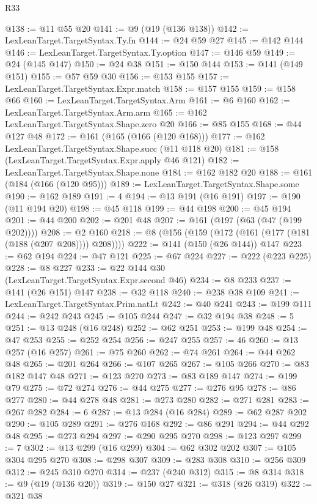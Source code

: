 \begin{lexlean}{R33}
\begin{coremodule}
@138 := @11 @55 @20
@141 := @9 (@19 (@136 @138))
@142 := LexLeanTarget.TargetSyntax.Ty.fn
@144 := @24 @59 @27
@145 := @142 @144
@146 := LexLeanTarget.TargetSyntax.Ty.option
@147 := @146 @59
@149 := @24 (@145 @147)
@150 := @24 @38
@151 := @150 @144
@153 := @141 (@149 @151)
@155 := @57 @59 @30
@156 := @153 @155
@157 := LexLeanTarget.TargetSyntax.Expr.match
@158 := @157 @155
@159 := @158 @66
@160 := LexLeanTarget.TargetSyntax.Arm
@161 := @6 @160
@162 := LexLeanTarget.TargetSyntax.Arm.arm
@165 := @162 LexLeanTarget.TargetSyntax.Shape.zero @20
@166 := @85 @155
@168 := @44 @127 @48
@172 := @161 (@165 (@166 (@120 @168)))
@177 := @162 LexLeanTarget.TargetSyntax.Shape.succ (@11 @118 @20)
@181 := @158 (LexLeanTarget.TargetSyntax.Expr.apply @46 @121)
@182 := LexLeanTarget.TargetSyntax.Shape.none
@184 := @162 @182 @20
@188 := @161 (@184 (@166 (@120 @95)))
@189 := LexLeanTarget.TargetSyntax.Shape.some
@190 := @162 @189
@191 := 4
@194 := @13 @191 (@16 @191)
@197 := @190 (@11 @194 @20)
@198 := @45 @118
@199 := @44 @198
@200 := @45 @194
@201 := @44 @200
@202 := @201 @48
@207 := @161 (@197 (@63 (@47 (@199 @202))))
@208 := @2 @160
@218 := @8 (@156 (@159 (@172 (@161 (@177 (@181 (@188 (@207 @208)))) @208))))
@222 := @141 (@150 (@26 @144)) @147
@223 := @62 @194
@224 := @47 @121
@225 := @67 @224
@227 := @222 (@223 @225)
@228 := @8 @227
@233 := @22 @144 @30 (LexLeanTarget.TargetSyntax.Expr.second @46)
@234 := @8 @233
@237 := @141 (@26 @151) @147
@238 := @32 @118
@240 := @238 @38 @109
@241 := LexLeanTarget.TargetSyntax.Prim.natLt
@242 := @40 @241
@243 := @199 @111
@244 := @242 @243
@245 := @105 @244
@247 := @32 @194 @38
@248 := 5
@251 := @13 @248 (@16 @248)
@252 := @62 @251
@253 := @199 @48
@254 := @47 @253
@255 := @252 @254
@256 := @247 @255
@257 := 46
@260 := @13 @257 (@16 @257)
@261 := @75 @260
@262 := @74 @261
@264 := @44 @262 @48
@265 := @201 @264
@266 := @107 @265
@267 := @105 @266
@270 := @83 @182 @147 @48
@271 := @123 @270
@273 := @83 @189 @147
@274 := @199 @79
@275 := @72 @274
@276 := @44 @275
@277 := @276 @95
@278 := @86 @277
@280 := @44 @278 @48
@281 := @273 @280
@282 := @271 @281
@283 := @267 @282
@284 := 6
@287 := @13 @284 (@16 @284)
@289 := @62 @287 @202
@290 := @105 @289
@291 := @276 @168
@292 := @86 @291
@294 := @44 @292 @48
@295 := @273 @294
@297 := @290 @295 @270
@298 := @123 @297
@299 := 7
@302 := @13 @299 (@16 @299)
@304 := @62 @302 @202
@307 := @105 @304 @295 @270
@308 := @298 @307
@309 := @283 @308
@310 := @256 @309
@312 := @245 @310 @270
@314 := @237 (@240 @312)
@315 := @8 @314
@318 := @9 (@19 (@136 @20))
@319 := @150 @27
@321 := @318 (@26 @319)
@322 := @321 @38

\end{coremodule}
\end{lexlean}
